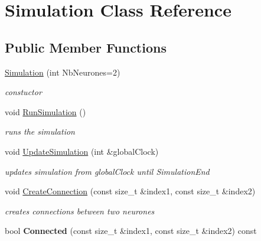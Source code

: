 \hypertarget{classSimulation}{\section{Simulation Class Reference}
\label{classSimulation}
}
\subsection*{Public Member Functions}
\begin{DoxyCompactItemize}
\item 
\hypertarget{classSimulation_ac8faed6aaf60d10a6b0a6f87c4c90bd2}{\hyperlink{classSimulation_ac8faed6aaf60d10a6b0a6f87c4c90bd2}{Simulation} (int Nb\-Neurones=2)}\label{classSimulation_ac8faed6aaf60d10a6b0a6f87c4c90bd2}

\begin{DoxyCompactList}\small\item\em constuctor \end{DoxyCompactList}\item 
\hypertarget{classSimulation_aa7736d6f953c5e35696b8ac2397a4bea}{void \hyperlink{classSimulation_aa7736d6f953c5e35696b8ac2397a4bea}{Run\-Simulation} ()}\label{classSimulation_aa7736d6f953c5e35696b8ac2397a4bea}

\begin{DoxyCompactList}\small\item\em runs the simulation \end{DoxyCompactList}\item 
void \hyperlink{classSimulation_a2d35287145b4c708ecc473b5ce871ae3}{Update\-Simulation} (int \&global\-Clock)
\begin{DoxyCompactList}\small\item\em updates simulation from global\-Clock until Simulation\-End \end{DoxyCompactList}\item 
void \hyperlink{classSimulation_a59aacc98d8ef86ab6b5b7b1c4f1c92fd}{Create\-Connection} (const size\-\_\-t \&index1, const size\-\_\-t \&index2)
\begin{DoxyCompactList}\small\item\em creates connections between two neurones \end{DoxyCompactList}\item 
\hypertarget{classSimulation_a6fa966b55e89ca6aa6c74f1e9317ee15}{bool {\bfseries Connected} (const size\-\_\-t \&index1, const size\-\_\-t \&index2) const }\label{classSimulation_a6fa966b55e89ca6aa6c74f1e9317ee15}


\end{DoxyCompactItemize}
